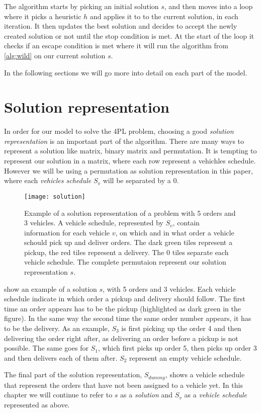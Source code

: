 \documentclass[../main.tex]{subfiles}
\begin{document}
The algorithm starts by picking an initial solution $s$, and then moves into a loop where it picks a heuristic $h$ and applies it to to the current solution, in each iteration.
It then updates the best solution and decides to accept the newly created solution or not until the stop condition is met.
At the start of the loop it checks if an escape condition is met where it will run the algorithm from \cref{alg:wild} on our current solution $s$. \par
In the following sections we will go more into detail on each part of the model.

\section{Solution representation}
\label{sec:represent}
In order for our model to solve the 4PL problem, choosing a good \textit{solution representation} is an important part of the algorithm. 
There  are many ways to represent a solution like matrix, binary matrix and permutation. 
It is tempting to represent our solution in a matrix, where each row represent a vehichles schedule. 
However we will be using a permutation as solution representation in this paper, where each \textit{vehicles schedule} $S_v$ will be separated by a $0$.  

\begin{figure}                                                                                     
    \centering                                                                                 
    \texttt{[image: solution]}                                     
    \caption{Example of a solution representation of a problem with 5 orders and 3 vehicles. A vehicle schedule, represented by $S_v$, contain information for each vehicle $v$, on which and in what order a vehicle schould pick up and deliver orders. The dark green tiles represent a pickup, the red tiles represent a delivery. The $0$ tiles separate each vehicle schedule. The complete permutaion represent our solution representation $s$.}
    \label{fig:solution}
\end{figure}

 show an example of a solution $s$, with 5 orders and 3 vehicles. Each vehicle schedule indicate in which order a pickup and delivery should follow. 
The first time an order appears has to be the pickup (highlighted as dark green in the figure). 
In the same way the second time the same order number appears, it has to be the delivery. 
As an example, $S_3$ is first picking up the order 4 and then delivering the order right after, as delivering an order before a pickup is not possible. The same goes for $S_1$, which first picks up order 5, then picks up order 3 and then delivers each of them after. $S_2$ represent an empty vehicle schedule. \par 
The final part of the solution representation, $S_{dummy}$, shows a vehicle schedule that represent the orders that have not been assigned to a vehicle yet.
In this chapter we will continue to refer to $s$ as a \textit{solution} and $S_v$ as a \textit{vehicle schedule} represented as above.
\end{document}
